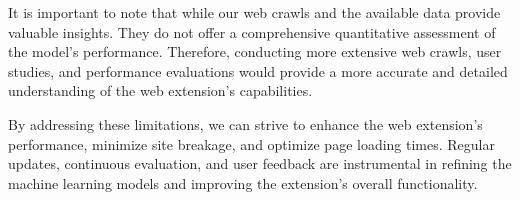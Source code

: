 It is important to note that while our web crawls and the available data provide valuable insights. They do not offer a 
comprehensive quantitative assessment of the model's performance. Therefore, conducting more extensive web crawls, user studies,
and performance evaluations would provide a more accurate and detailed understanding of the web extension's capabilities.

By addressing these limitations, we can strive to enhance the web extension's performance, minimize site breakage, and optimize
page loading times. Regular updates, continuous evaluation, and user feedback are instrumental in refining the machine learning models
and improving the extension's overall functionality.


